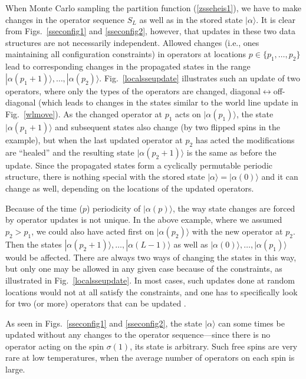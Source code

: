 \documentclass[draft,numberedheadings]{aipproc}
\begin{document}
When Monte Carlo sampling the partition function (\ref{zsseheis1}), we have to make changes in the operator sequence $S_L$ as well as in the stored state 
$|\alpha\rangle$. It is clear from Figs.~\ref{sseconfig1} and \ref{sseconfig2}, however, that updates in these two data structures are not necessarily 
independent. Allowed changes (i.e., ones maintaining all configuration constraints) in operators at locations $p \in \{p_1,\ldots,p_2\}$ lead to corresponding 
changes in the propagated states in the range $|\alpha(p_1+1)\rangle, \ldots, |\alpha(p_2)\rangle$. Fig.~\ref{localsseupdate} illustrates such an update of 
two operators, where only the types of the operators are changed, diagonal$\leftrightarrow$off-diagonal (which leads to changes in the states similar to the 
world line update in Fig.~\ref{wlmove}). As the changed operator at $p_1$ acts on $|\alpha (p_1)\rangle$, the state $|\alpha (p_1+1)\rangle$ and subsequent states 
also change (by two flipped spins in the example), but when the last updated operator at $p_2$ has acted the modifications are ``healed'' and the resulting 
state $|\alpha(p_2+1)\rangle$ is the same as before the update. Since the propagated states form a cyclically permutable periodic structure, there is nothing 
special with the stored state $|\alpha\rangle=|\alpha(0)\rangle$ and it can change as well, depending on the locations of the updated operators.

Because of the time ($p$) periodicity of $|\alpha(p)\rangle$, the way state changes are forced by operator updates is not unique. In the above example, where we assumed 
$p_2>p_1$, we could also have acted first on $|\alpha (p_2)\rangle$ with the new operator at $p_2$. Then the states $|\alpha(p_2+1)\rangle, \ldots, |\alpha(L-1)\rangle$ 
as well as $|\alpha(0)\rangle, \ldots, |\alpha(p_1)\rangle$ would be affected. There are always two ways of changing the states in this way, but only one may be 
allowed in any given case because of the constraints, as illustrated in Fig.~\ref{localsseupdate}. In most cases, such updates done at random locations would not at all 
satisfy the constraints, and one has to specifically look for two (or more) operators that can be updated \cite{sandvik97}.

As seen in Figs.~\ref{sseconfig1} and \ref{sseconfig2}, the state $|\alpha\rangle$ can some times be updated without any changes to the operator sequence---since 
there  is no operator acting on the spin $\sigma(1)$, its state is arbitrary. Such free spins are very rare at low temperatures, when the average number of 
operators on each spin is large.
\end{document}
